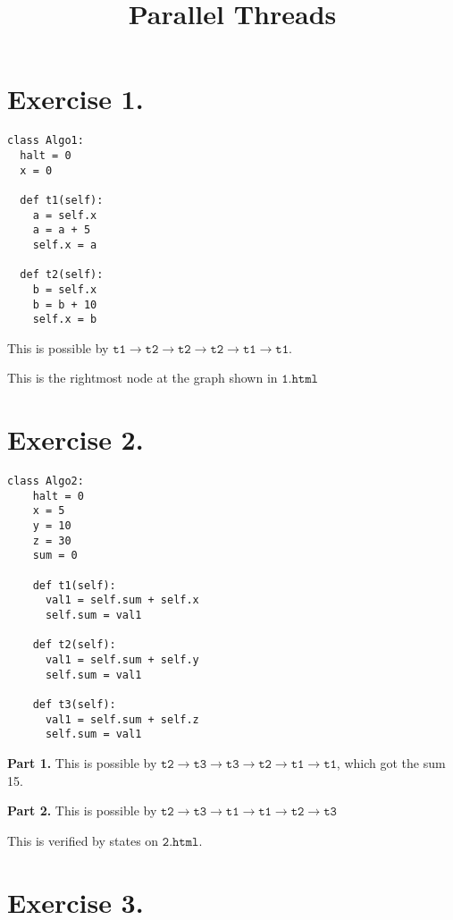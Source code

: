 \documentclass[a4paper, justified]{tufte-handout}
\title{Parallel Threads}
\newcommand{\ttt}[0]{\texttt}
\begin{document}
\maketitle

\section{Exercise 1.}

\begin{verbatim}
class Algo1:
  halt = 0
  x = 0
 
  def t1(self):
    a = self.x
    a = a + 5
    self.x = a
 
  def t2(self):
    b = self.x
    b = b + 10
    self.x = b
\end{verbatim}

This is possible by $\ttt{t1}\rightarrow \ttt{t2} \rightarrow \ttt{t2}\rightarrow \ttt{t2}\rightarrow \ttt{t1}\rightarrow \ttt{t1}$.

This is the rightmost node at the graph shown in $\ttt{1.html}$

\section{Exercise 2.}

\begin{verbatim}
class Algo2:
    halt = 0
    x = 5
    y = 10
    z = 30
    sum = 0
   
    def t1(self):
      val1 = self.sum + self.x
      self.sum = val1
   
    def t2(self):
      val1 = self.sum + self.y
      self.sum = val1
   
    def t3(self):
      val1 = self.sum + self.z
      self.sum = val1
\end{verbatim}

\textbf{Part 1.} This is possible by $\ttt{t2}\rightarrow \ttt{t3} \rightarrow \ttt{t3}\rightarrow \ttt{t2}\rightarrow \ttt{t1}\rightarrow \ttt{t1}$, which got the sum 15. 




\textbf{Part 2.} This is possible by $\ttt{t2}\rightarrow \ttt{t3} \rightarrow \ttt{t1}\rightarrow \ttt{t1}\rightarrow \ttt{t2}\rightarrow \ttt{t3}$

This is verified by states on $\ttt{2.html}$. 

\section{Exercise 3.}
\end{document}
